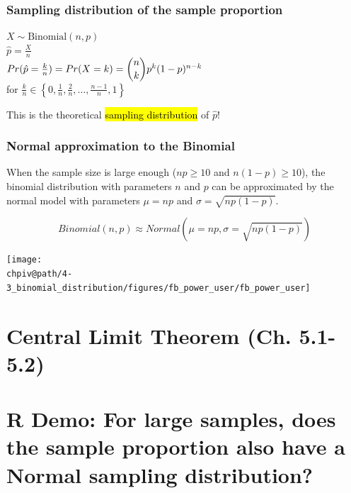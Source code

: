 \documentclass[t,compress,mathserif]{beamer}
\makeatletter
\def\chpiv@path{../../Chp 4}
\makeatother
\begin{document}

\begin{frame}
\frametitle{Sampling distribution of the sample proportion}

$X \sim \text{Binomial}(n, p)$ \\
$\hat{p}  = \frac{X}{n}$ \\

\vspace{1em}
\textcolor{orange}{$Pr(\hat{p}  = \frac{k}{n}) = Pr(X = k) = \dbinom{n}{k} p^k (1-p)^{n-k}$} \\
for $\frac{k}{n} \in \left\{0, \frac{1}{n}, \frac{2}{n}, \ldots, \frac{n-1}{n}, 1\right\}$


This is the theoretical \hl{sampling distribution} of $\hat{p}$!
\end{frame}

\begin{frame}
\frametitle{Normal approximation to the Binomial}

When the sample size is large enough ($np \ge 10$  and  $n(1-p) \ge 10$), the binomial distribution with parameters $n$ and $p$ can be approximated by the normal model with parameters $\mu = np$ and $\sigma = \sqrt{np(1-p)}$.

\[Binomial(n,p) \approx Normal(\mu = np, \sigma = \sqrt{np(1-p)})\]

\begin{center}
\texttt{[image: \\chpiv@path/4-3\_binomial\_distribution/figures/fb\_power\_user/fb\_power\_user]}
\end{center}

\end{frame}


\section{Central Limit Theorem (Ch. 5.1-5.2)}


\section{R Demo: For large samples, does the sample proportion also have a Normal sampling distribution? }

\end{document}
